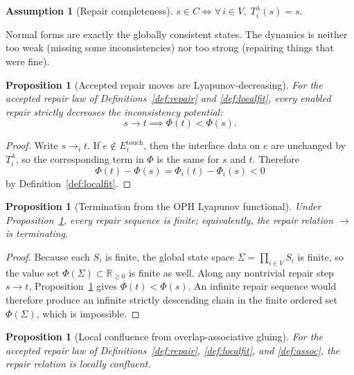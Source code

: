 \documentclass[11pt]{article}
\newtheorem{assumption}[theorem]{Assumption}
\newtheorem{proposition}[theorem]{Proposition}
\theoremstyle{remark}
\theoremstyle{plain}
\begin{document}
\begin{assumption}[Repair completeness]\label{ass:complete}
$s\in C \iff \forall\, i\in V,\; T_i^\lambda(s)=s.$
\end{assumption}

Normal forms are exactly the globally consistent states. The dynamics is neither too weak (missing some inconsistencies) nor too strong (repairing things that were fine).

\begin{proposition}[Accepted repair moves are Lyapunov-decreasing]\label{prop:lyapunov-descent}
For the accepted repair law of Definitions~\ref{def:repair} and \ref{def:localfit}, every enabled
repair strictly decreases the inconsistency potential:
\[
s\to t \implies \Phi(t)<\Phi(s).
\]
\end{proposition}

\begin{proof}
Write \(s\to_i t\). If \(e\notin E_i^{\mathrm{touch}}\), then the interface data on \(e\) are
unchanged by \(T_i^\lambda\), so the corresponding term in \(\Phi\) is the same for \(s\) and
\(t\). Therefore
\[
\Phi(t)-\Phi(s)=\Phi_i(t)-\Phi_i(s)<0
\]
by Definition~\ref{def:localfit}.
\end{proof}

\begin{proposition}[Termination from the OPH Lyapunov functional]\label{prop:lyapunov-termination}
Under Proposition~\ref{prop:lyapunov-descent}, every repair sequence is finite; equivalently, the
repair relation \(\to\) is terminating.
\end{proposition}

\begin{proof}
Because each \(S_i\) is finite, the global state space \(\Sigma=\prod_{i\in V}S_i\) is finite, so
the value set \(\Phi(\Sigma)\subset\mathbb{R}_{\ge 0}\) is finite as well. Along any nontrivial
repair step \(s\to t\), Proposition~\ref{prop:lyapunov-descent} gives \(\Phi(t)<\Phi(s)\). An infinite repair
sequence would therefore produce an infinite strictly descending chain in the finite ordered set
\(\Phi(\Sigma)\), which is impossible.
\end{proof}

\begin{proposition}[Local confluence from overlap-associative gluing]\label{prop:local-confluence}
For the accepted repair law of Definitions~\ref{def:repair}, \ref{def:localfit}, and
\ref{def:assoc}, the repair relation is locally confluent.
\end{proposition}
\end{document}
